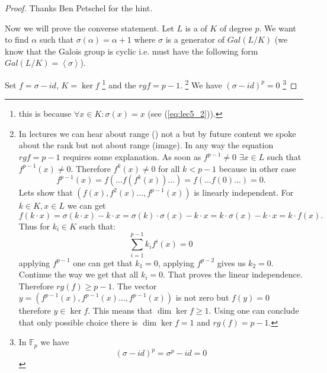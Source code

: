\begin{theorem}
\begin{proof}
{      Thanks Ben Petschel for the hint.
    }

    Now we will prove the converse statement. Let $L$ is a
     of $K$ of degree $p$. We want to
    find $\alpha$ such that $\sigma\left(\alpha\right) = \alpha + 1$
    where $\sigma$ is a generator of $Gal\left(L/K\right)$ (we know
    that the Galois group is cyclic i.e. must have the following form
    $Gal\left(L/K\right) = \left<\sigma\right>$).

    Set $f = \sigma -id$, $K = \ker f$
    \footnote{
      this is because
      $\forall x \in K: \sigma\left(x\right) = x$ (see
      (\ref{eq:lec5_2})).
    }
    and the  $rg f = p -1$.
    \footnote{
      In lectures we can hear about range () not a
       but by future content we spoke about the rank
      but not about range (image). In any way the equation $rg f = p
      -1$ requires some explanation. As soon as $f^{p-1} \ne 0$
      $\exists x \in L$ such that $f^{p-1}\left(x\right) \ne
      0$. Therefore $f^{k}\left(x\right) \ne 0$  for all $k < p - 1$
      because in other case
      \[
      f^{p-1}\left(x\right) = f\left( \dots f\left(
      f^k\left(x\right) \right) \dots \right) =
      f\left( \dots f\left( 0 \right) \dots \right) =
      0.
      \]
      Lets show that $\left(f\left(x\right), f^2\left(x\right)\dots,
      f^{p-1}\left(x\right) \right)$ is linearly independent.
      For $k \in K, x \in L$ we can get
      \[
      f\left(k \cdot x\right) =
      \sigma\left(k \cdot x\right) - k \cdot x =
      \sigma\left(k\right) \cdot \sigma\left(x\right) -
      k \cdot x = k \cdot \sigma\left(x\right) - k \cdot x =
      k \cdot f\left(x\right).
      \]
      Thus for $k_i \in K$ such that:
      \[
      \sum_{i=1}^{p-1} k_i f^i\left(x\right) = 0
      \]
      applying $f^{p-1}$ one can get that $k_1 = 0$, applying
      $f^{p-2}$ gives us $k_2 = 0$. Continue the way we get that all
      $k_i = 0$. That proves the linear independence. Therefore
      $rg\left(f\right) \ge p - 1$. The vector
      $y = \left(f^{p-1}\left(x\right), f^{p-1}\left(x\right)\dots,
      f^{p-1}\left(x\right) \right)$ is not zero but $f(y) = 0$
      therefore $y \in \ker f$. This means that $\dim{\ker f} \ge
      1$. Using  one can conclude that only
      possible choice there is $\dim{\ker f} = 1$ and
      $rg\left(f\right) = p - 1$. 
    }
    We have 
    $\left(\sigma - id\right)^p = 0$
    \footnote{
      In $\mathbb{F}_p$ we have
      \[
      \left(\sigma - id\right)^p = \sigma^p - id = 0
\]}
\end{proof}
\end{theorem}
